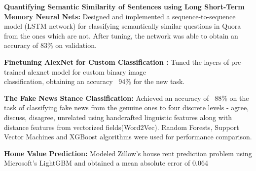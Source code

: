 %
\begin{cventries}
\vspace{-5mm}
  \cventry
    {}
    {}
    {}
    {}
    {
      \begin{cvitems}
      \item {{ \textbf{Quantifying Semantic Similarity of Sentences using Long Short-Term Memory Neural Nets:} Designed and implemented a sequence-to-sequence model (LSTM network) for classifying semantically similar questions in Quora from the ones which are not. After tuning, the network was able to obtain an accuracy of 83\% on validation.}}
      \item {{\textbf{Finetuning AlexNet for Custom Classification : } Tuned the layers of pre-trained alexnet model for custom binary image \\ classification, obtaining an accuracy ~94\% for the new task.}}
      \item { \textbf{The Fake News Stance Classification:} Achieved an accuracy of ~88\% on the task of classifying fake news from the genuine ones to four discrete levels - agree, discuss, disagree, unrelated using handcrafted linguistic features along with distance features from vectorized fields(Word2Vec). Random Forests, Support Vector Machines and XGBoost algorithms were used for performance comparison.}
      \item { \textbf{Home Value Prediction:} Modeled Zillow's house rent prediction problem using Microsoft's LightGBM and obtained a mean absolute error of 0.064}
      \end{cvitems}
    }
\end{cventries}
